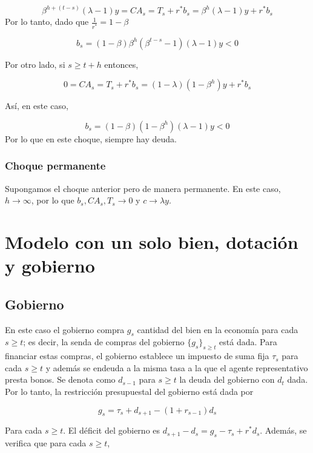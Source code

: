 \documentclass[]{article}
\begin{document}
\[
\beta^{h +(t-s)}(\lambda-1)y = CA_s = T_s + r^*b_s = \beta^h(\lambda - 1)y + r^*b_s
\] Por lo tanto, dado que \(\frac{1}{r^*} = 1-\beta\)

\[
b_s = (1-\beta)\beta^h\left(\beta^{t-s} - 1\right)(\lambda-1)y < 0
\]

Por otro lado, si \(s \geq t+h\) entonces,

\[
0 = CA_s = T_s + r^* b_s = (1-\lambda)(1-\beta^h)y + r^* b_s
\]

Así, en este caso,

\[
b_s = (1-\beta)(1-\beta^h)(\lambda-1)y < 0
\] Por lo que en este choque, siempre hay deuda.

\subsubsection{Choque permanente}\label{choque-permanente}

Supongamos el choque anterior pero de manera permanente. En este caso,
\(h \rightarrow \infty\), por lo que \(b_s, CA_s, T_s \rightarrow 0\) y
\(c \rightarrow \lambda y\).

\section{Modelo con un solo bien, dotación y
gobierno}\label{modelo-con-un-solo-bien-dotacion-y-gobierno}

\subsection{Gobierno}\label{gobierno}

En este caso el gobierno compra \(g_s\) cantidad del bien en la economía
para cada \(s \geq t\); es decir, la senda de compras del gobierno
\(\{g_s\}_{s \geq t}\) está dada. Para financiar estas compras, el
gobierno establece un impuesto de suma fija \(\tau_s\) para cada
\(s \geq t\) y además se endeuda a la misma tasa a la que el agente
representativo presta bonos. Se denota como \(d_{s-1}\) para
\(s \geq t\) la deuda del gobierno con \(d_t\) dada. Por lo tanto, la
restricción presupuestal del gobierno está dada por

\[
\begin{equation}
g_s = \tau_s + d_{s+1} - (1+r_{s-1})d_s
\label{eq:rpgob}
\end{equation}
\]

Para cada \(s \geq t\). El déficit del gobierno es
\(d_{s+1} -d_s = g_s - \tau_s + r^*d_s\). Además, se verifica que para
cada \(s \geq t\),
\end{document}
